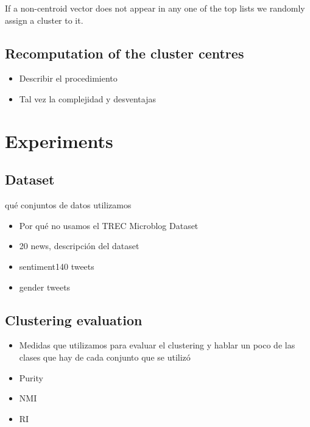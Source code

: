 \documentclass[runningheads]{llncs}
\begin{document}
If a non-centroid vector does not appear in any one of the
top lists we randomly assign a cluster to it.


\subsection{Recomputation of the cluster centres}




\begin{itemize}
\item Describir el procedimiento
\item Tal vez la complejidad y desventajas
\end{itemize}

\section{Experiments}

\subsection{Dataset}

qué conjuntos de datos utilizamos

\begin{itemize}
\item Por qué no usamos el TREC Microblog Dataset
\item 20 news, descripción del dataset 
\item sentiment140 tweets
\item gender tweets
\end{itemize}

\subsection{Clustering evaluation}
\begin{itemize}
\item Medidas que utilizamos para evaluar el clustering y hablar un poco de las clases
que hay de cada conjunto que se utilizó
\item Purity
\item NMI
\item RI

\end{itemize}
\end{document}
